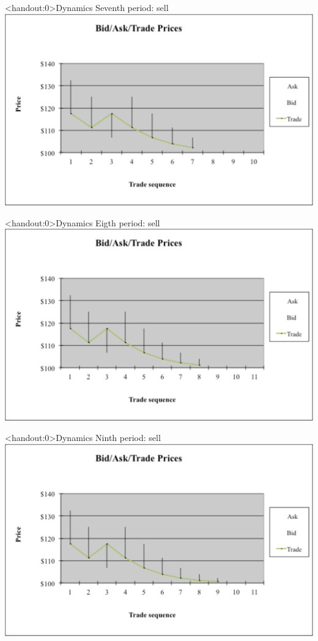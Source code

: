 \documentclass[english,10pt]{beamer}
\begin{document}
\begin{frame}<handout:0>{Dynamics}
	Seventh period: sell
	\center
	\includegraphics[width=0.9\linewidth]{pics/P7_Image.pdf}
\end{frame}


\begin{frame}<handout:0>{Dynamics}
	Eigth period: sell
	\center
	\includegraphics[width=0.9\linewidth]{pics/P8_Image.pdf}
\end{frame}


\begin{frame}<handout:0>{Dynamics}
	Ninth period: sell
	\center
	\includegraphics[width=0.9\linewidth]{pics/P9_Image.pdf}
\end{frame}
\end{document}
